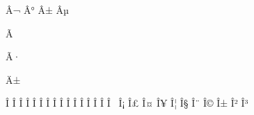 
\mubyte \neg ^^c2^^ac\endmubyte %
\mubyte \degree ^^c2^^b0\endmubyte %
\mubyte \pm ^^c2^^b1\endmubyte %
\mubyte \mu ^^c2^^b5\endmubyte %

\mubyte \times ^^c3^^97\endmubyte %

\mubyte \div ^^c3^^b7\endmubyte %

\mubyte \imath ^^c4^^b1\endmubyte %

\mubyte \Alpha ^^ce^^91\endmubyte %
\mubyte \Beta ^^ce^^92\endmubyte %
\mubyte \Gamma ^^ce^^93\endmubyte %
\mubyte \Delta ^^ce^^94\endmubyte %
\mubyte \Epsilon ^^ce^^95\endmubyte %
\mubyte \Zeta ^^ce^^96\endmubyte %
\mubyte \Eta ^^ce^^97\endmubyte %
\mubyte \Theta ^^ce^^98\endmubyte %
\mubyte \Iota ^^ce^^99\endmubyte %
\mubyte \Kappa ^^ce^^9a\endmubyte %
\mubyte \Lambda ^^ce^^9b\endmubyte %
\mubyte \Mu ^^ce^^9c\endmubyte %
\mubyte \Nu ^^ce^^9d\endmubyte %
\mubyte \Xi ^^ce^^9e\endmubyte %
\mubyte \Omicron ^^ce^^9f\endmubyte %
\mubyte \Pi ^^ce^^a0\endmubyte %
\mubyte \Rho ^^ce^^a1\endmubyte %
\mubyte \Sigma ^^ce^^a3\endmubyte %
\mubyte \Tau ^^ce^^a4\endmubyte %
\mubyte \Upsilon ^^ce^^a5\endmubyte %
\mubyte \Phi ^^ce^^a6\endmubyte %
\mubyte \Chi ^^ce^^a7\endmubyte %
\mubyte \Psi ^^ce^^a8\endmubyte %
\mubyte \Omega ^^ce^^a9\endmubyte %
\mubyte \alpha ^^ce^^b1\endmubyte %
\mubyte \beta ^^ce^^b2\endmubyte %
\mubyte \gamma ^^ce^^b3\endmubyte %
